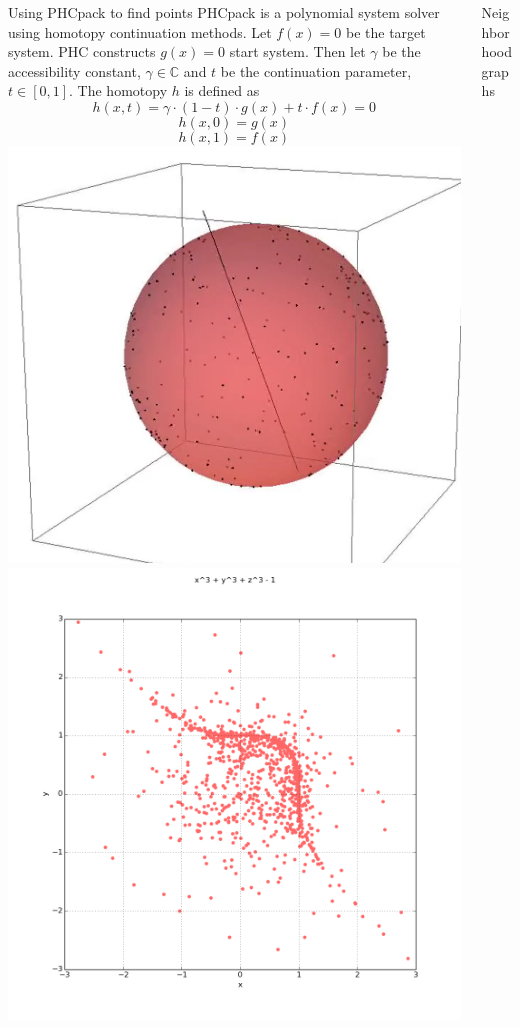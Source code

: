 \documentclass{beamer}
\def\C{\mathbb C}
\begin{document}
\begin{frame}{}
\begin{columns}[t]
\begin{column}{0.32\linewidth}
\begin{block}{Using PHCpack to find points}
PHCpack is a polynomial system solver using homotopy continuation methods. Let $f(x) = 0$ be the target system. PHC constructs $g(x)=0$ start system. Then let $\gamma$ be the accessibility constant, $\gamma \in \C$ and $t$ be the continuation parameter, $t \in [0,1]$. The homotopy $h$ is defined as
\begin{equation*}
h(x,t) = \gamma \cdot (1-t)\cdot g(x) + t \cdot f(x) = 0
\end{equation*}
\begin{equation*}
h(x, 0) =g(x)
\end{equation*}
\begin{equation*}
h(x, 1) = f(x)
\end{equation*}
\includegraphics[width=.5\columnwidth]{sphere}
\includegraphics[width=.5\columnwidth]{plot2d_5}


\end{block}


\end{column}%

\begin{column}{0.32\linewidth}

\begin{block}{Neighborhood graphs}


\end{block}
\end{column}
\end{columns}
\end{frame}
\end{document}
